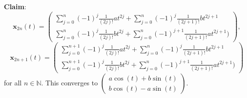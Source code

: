 \documentclass[a4paper]{article}
\begin{document}
\textbf{Claim}: 
 \[
 	\mathbf x_{2n}(t) = \begin{pmatrix}\sum^n_{j=0} (-1)^j \frac{1}{(2j)!}at^{2j} + \sum^n_{j=0} (-1)^j \frac{1}{(2j+1)!}bt^{2j+1} \\
 	\sum^n_{j=0} (-1)^j \frac{1}{(2j)!}bt^{2j} + \sum^n_{j=0} (-1)^{j+1} \frac{1}{(2j+1)!}at^{2j+1})
 	\end{pmatrix},
 \]
  \[
 	\mathbf x_{2n+1}(t) = \begin{pmatrix}\sum^{n+1}_{j=0} (-1)^j \frac{1}{(2j)!}at^{2j} + \sum^n_{j=0} (-1)^j \frac{1}{(2j+1)!}bt^{2j+1} \\
 	\sum^{n+1}_{j=0} (-1)^j \frac{1}{(2j)!}bt^{2j} + \sum^n_{j=0} (-1)^{j+1} \frac{1}{(2j+1)!}at^{2j+1})
 	\end{pmatrix}
 \]
 for all $n \in \mathbb N$.
 This converges to $ \begin{pmatrix}
 		a\cos(t) + b\sin(t) \\ b\cos(t) - a \sin(t)
 	\end{pmatrix}$.
 
\end{document}
